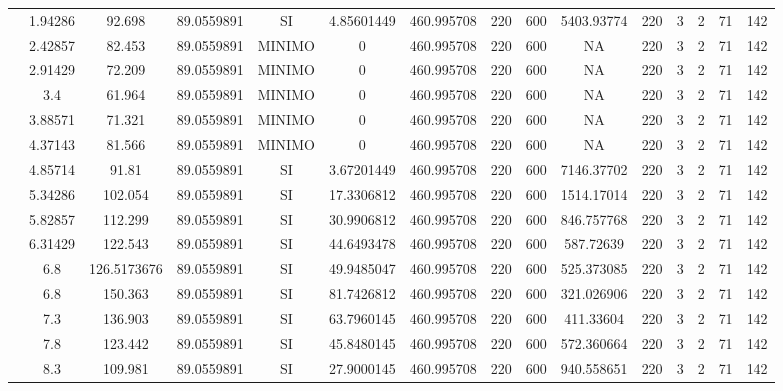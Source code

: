 \begin{table}[H]
{\begin{tabular}{|c|c|c|c|c|c|c|c|c|c|c|c|c|c|c|}
\cline{2-15}    & 1.94286 & 92.698 & 89.0559891 & SI  & 4.85601449 & 460.995708 & 220 & 600 & 5403.93774 & 220 & 3   & 2   & 71  & 142 \bigstrut\\
\cline{2-15}    & 2.42857 & 82.453 & 89.0559891 & MINIMO & 0   & 460.995708 & 220 & 600 & NA  & 220 & 3   & 2   & 71  & 142 \bigstrut\\
\cline{2-15}    & 2.91429 & 72.209 & 89.0559891 & MINIMO & 0   & 460.995708 & 220 & 600 & NA  & 220 & 3   & 2   & 71  & 142 \bigstrut\\
\cline{2-15}    & 3.4 & 61.964 & 89.0559891 & MINIMO & 0   & 460.995708 & 220 & 600 & NA  & 220 & 3   & 2   & 71  & 142 \bigstrut\\
\cline{2-15}    & 3.88571 & 71.321 & 89.0559891 & MINIMO & 0   & 460.995708 & 220 & 600 & NA  & 220 & 3   & 2   & 71  & 142 \bigstrut\\
\cline{2-15}    & 4.37143 & 81.566 & 89.0559891 & MINIMO & 0   & 460.995708 & 220 & 600 & NA  & 220 & 3   & 2   & 71  & 142 \bigstrut\\
\cline{2-15}    & 4.85714 & 91.81 & 89.0559891 & SI  & 3.67201449 & 460.995708 & 220 & 600 & 7146.37702 & 220 & 3   & 2   & 71  & 142 \bigstrut\\
\cline{2-15}    & 5.34286 & 102.054 & 89.0559891 & SI  & 17.3306812 & 460.995708 & 220 & 600 & 1514.17014 & 220 & 3   & 2   & 71  & 142 \bigstrut\\
\cline{2-15}    & 5.82857 & 112.299 & 89.0559891 & SI  & 30.9906812 & 460.995708 & 220 & 600 & 846.757768 & 220 & 3   & 2   & 71  & 142 \bigstrut\\
\cline{2-15}    & 6.31429 & 122.543 & 89.0559891 & SI  & 44.6493478 & 460.995708 & 220 & 600 & 587.72639 & 220 & 3   & 2   & 71  & 142 \bigstrut\\
\cline{2-15}    & 6.8 & 126.5173676 & 89.0559891 & SI  & 49.9485047 & 460.995708 & 220 & 600 & 525.373085 & 220 & 3   & 2   & 71  & 142 \bigstrut\\
\cline{2-15}    & 6.8 & 150.363 & 89.0559891 & SI  & 81.7426812 & 460.995708 & 220 & 600 & 321.026906 & 220 & 3   & 2   & 71  & 142 \bigstrut\\
\cline{2-15}    & 7.3 & 136.903 & 89.0559891 & SI  & 63.7960145 & 460.995708 & 220 & 600 & 411.33604 & 220 & 3   & 2   & 71  & 142 \bigstrut\\
\cline{2-15}    & 7.8 & 123.442 & 89.0559891 & SI  & 45.8480145 & 460.995708 & 220 & 600 & 572.360664 & 220 & 3   & 2   & 71  & 142 \bigstrut\\
\cline{2-15}    & 8.3 & 109.981 & 89.0559891 & SI  & 27.9000145 & 460.995708 & 220 & 600 & 940.558651 & 220 & 3   & 2   & 71  & 142 \bigstrut\\

\end{tabular}}
\end{table}
